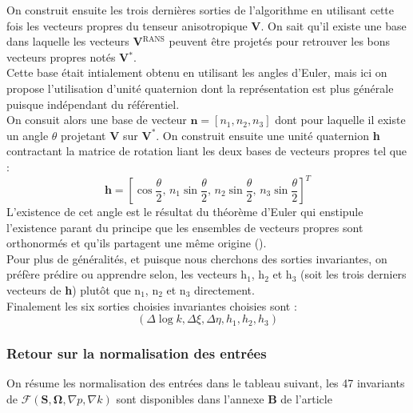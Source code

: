 \documentclass[a4paper,12pt]{report}
\newcommand{\bepar}[1]{
	\left( #1 \right)  
}
\newcommand{\becro}[1]{
	\left[ #1 \right]  
}
\numberwithin{equation}{section} %
\begin{document}
\noindent On construit ensuite les trois dernières sorties de l'algorithme en utilisant cette fois les vecteurs propres du tenseur anisotropique \textbf{V}. On sait qu'il existe une base dans laquelle les vecteurs \textbf{V}$^{\text{RANS}}$ peuvent être projetés pour retrouver les bons vecteurs propres notés \textbf{V}$^*$.\\
Cette base était intialement obtenu en utilisant les angles d'Euler, mais ici on propose l'utilisation d'unité quaternion  dont la représentation est plus générale puisque indépendant du référentiel.\\
On consuit alors une base de vecteur $\textbf{n} = \becro{n_1,n_2,n_3}$ dont pour laquelle il existe un angle $\theta$ projetant $\textbf{V}$ sur $\textbf{V}^*$. On construit ensuite une unité quaternion \textbf{h} contractant la matrice de rotation liant les deux bases de vecteurs propres tel que :
\begin{equation*}
 \textbf{h} = \becro{\cos \frac{\theta}{2},\, n_1\sin\frac{\theta}{2}, \, n_2\sin\frac{\theta}{2}, \, n_3\sin\frac{\theta}{2}}^T  
\end{equation*}   
L'existence de cet angle est le résultat du théorème d'Euler qui enstipule l'existence parant du principe que les ensembles de vecteurs propres sont orthonormés et qu'ils partagent une même origine (\cite{wang2017physics}).\\
Pour plus de généralités, et puisque nous cherchons des sorties invariantes, on préfère prédire ou apprendre selon, les vecteurs h$_1$, h$_2$ et h$_3$ (soit les trois derniers vecteurs de \textbf{h}) plutôt que n$_1$, n$_2$ et n$_3$ directement.\\
Finalement les six sorties choisies invariantes choisies sont :
\begin{equation*}
\bepar{\Delta \log k, \Delta \xi, \Delta \eta, h_1, h_2, h_3}
\end{equation*}

\subsubsection*{Retour sur la normalisation des entrées}
On résume les normalisation des entrées dans le tableau suivant, les 47 invariants de $\mathcal{F}\bepar{\textbf{S}, \mathbf{\Omega}, \nabla p, \nabla k}$ sont disponibles dans l'annexe \textbf{B} de l'article \cite{wu2018data}
\end{document}
